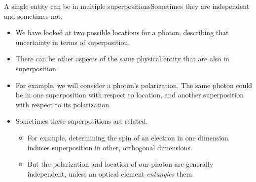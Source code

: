 \begin{frame}{A single entity can be in multiple superpositions}{Sometimes they are independent and sometimes not.}
\begin{itemize}
    \item We have looked at two possible locations for a photon, describing that uncertainty in terms of superposition.
    \item There can be other aspects of the same physical entity that are also in superposition.
    \item For example, we will consider a photon's polarization.  The same photon could be in one superposition with respect to location, and another superposition with respect to its polarization.
    \item Sometimes these superpositions are related.
    \begin{itemize}
        \item For example, determining the spin of an electron in one dimension induces superposition in other, orthogonal dimensions.
        \item But the polarization and location of our photon are generally independent, unless an optical element \emph{entangles} them.
    \end{itemize}
\end{itemize}
\end{frame}

